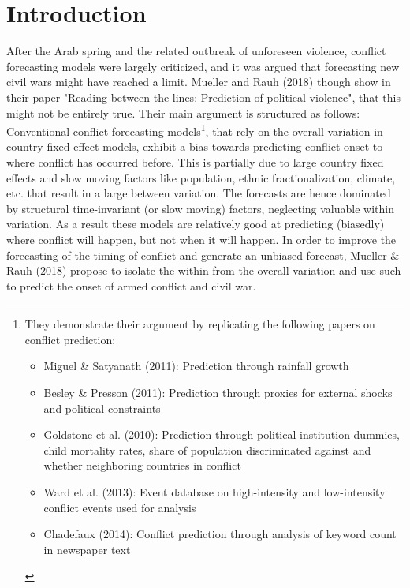 \renewcommand{\contentsname}{Table of Contents}
\tableofcontents
\clearpage

\section{Introduction}
After the Arab spring and the related outbreak of unforeseen violence, conflict forecasting models were largely criticized, and it was argued that forecasting new civil wars might have reached a limit.
Mueller and Rauh (2018) though show in their paper "Reading between the lines: Prediction of political violence", that this might not be entirely true.
Their main argument is structured as follows: Conventional conflict forecasting models\footnote{\noindent They demonstrate their argument by replicating the following papers on conflict prediction: \begin{itemize}
    \item Miguel \& Satyanath (2011): Prediction through rainfall growth
    \item Besley \& Presson (2011): Prediction through proxies for external shocks and political constraints
    \item Goldstone et al. (2010): Prediction through political institution dummies, child mortality rates, share of population discriminated against and whether neighboring countries in conflict
    \item Ward et al. (2013): Event database on high-intensity and low-intensity conflict events used for analysis
    \item Chadefaux (2014): Conflict prediction through analysis of keyword count in newspaper text
\end{itemize}}, that rely on the overall variation in country fixed effect models, exhibit a bias towards predicting conflict onset to where conflict has occurred before.
This is partially due to large country fixed effects and slow moving factors like population, ethnic fractionalization, climate, etc. that result in a large between variation.
The forecasts are hence dominated by structural time-invariant (or slow moving) factors, neglecting valuable within variation.
As a result these models are relatively good at predicting (biasedly) where conflict will happen, but not when it will happen.
In order to improve the forecasting of the timing of conflict and generate an unbiased forecast, Mueller \& Rauh (2018) propose to isolate the within from the overall variation and use such to predict the onset of armed conflict and civil war.
